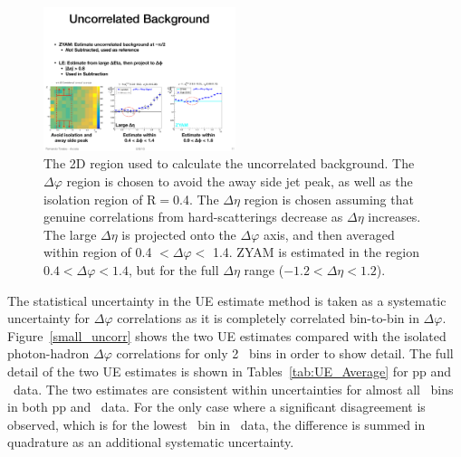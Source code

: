 \begin{figure}[htpb]
\center
\includegraphics[width=0.5\textwidth]{Data_Analysis/EventMixing/LE_map.pdf}
\caption{The 2D region used to calculate the uncorrelated background. The $\Delta\varphi$ region is chosen to avoid the away side jet peak, as well as the isolation region of R$=$0.4. The $\Delta\eta$ region is chosen assuming that genuine correlations from hard-scatterings decrease as $\Delta\eta$ increases. The large $\Delta\eta$ is projected onto the $\Delta\varphi$ axis, and then averaged within region of 0.4 $<\Delta\varphi<$ 1.4. ZYAM is estimated in the region $ 0.4 < \Delta\varphi < 1.4$, but for the full $\Delta\eta$ range ($-1.2 < \Delta\eta < 1.2$).}
\label{fig:LE_Map}
\end{figure}

The statistical uncertainty in the UE estimate method is taken as a systematic uncertainty for $\Delta\varphi$ correlations as it is completely correlated bin-to-bin in $\Delta\varphi$.
Figure~\ref{small_uncorr} shows the two UE estimates compared with the isolated photon-hadron $\Delta\varphi$ 
correlations for only 2 \zt~bins in order to show detail. The full detail of the two UE estimates is shown in Tables~\ref{tab:UE_Average} for pp and \pPb~data. The two estimates are consistent within uncertainties for almost all \zt~bins in both pp and \pPb~data. For the only case where a significant disagreement is observed, which is for the lowest \zt~bin in \pPb~data, the difference is summed in quadrature as an additional systematic uncertainty. 

